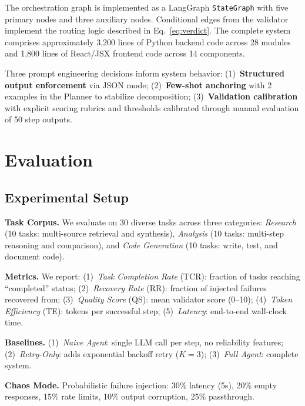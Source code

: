 \documentclass[conference]{IEEEtran}
\begin{document}
The orchestration graph is implemented as a LangGraph \texttt{StateGraph} with five primary nodes and three auxiliary nodes. Conditional edges from the validator implement the routing logic described in Eq.~\ref{eq:verdict}. The complete system comprises approximately 3,200 lines of Python backend code across 28 modules and 1,800 lines of React/JSX frontend code across 14 components.

Three prompt engineering decisions inform system behavior: (1)~\textbf{Structured output enforcement} via JSON mode; (2)~\textbf{Few-shot anchoring} with 2 examples in the Planner to stabilize decomposition; (3)~\textbf{Validation calibration} with explicit scoring rubrics and thresholds calibrated through manual evaluation of 50 step outputs.

\section{Evaluation}
\label{sec:evaluation}

\subsection{Experimental Setup}

\textbf{Task Corpus.} We evaluate on 30 diverse tasks across three categories: \textit{Research} (10 tasks: multi-source retrieval and synthesis), \textit{Analysis} (10 tasks: multi-step reasoning and comparison), and \textit{Code Generation} (10 tasks: write, test, and document code).

\textbf{Metrics.} We report: (1)~\textit{Task Completion Rate} (TCR): fraction of tasks reaching ``completed'' status; (2)~\textit{Recovery Rate} (RR): fraction of injected failures recovered from; (3)~\textit{Quality Score} (QS): mean validator score (0--10); (4)~\textit{Token Efficiency} (TE): tokens per successful step; (5)~\textit{Latency}: end-to-end wall-clock time.

\textbf{Baselines.} (1)~\textit{Naive Agent}: single LLM call per step, no reliability features; (2)~\textit{Retry-Only}: adds exponential backoff retry ($K{=}3$); (3)~\textit{Full Agent}: complete system.

\textbf{Chaos Mode.} Probabilistic failure injection: 30\% latency (5s), 20\% empty responses, 15\% rate limits, 10\% output corruption, 25\% passthrough.
\end{document}
